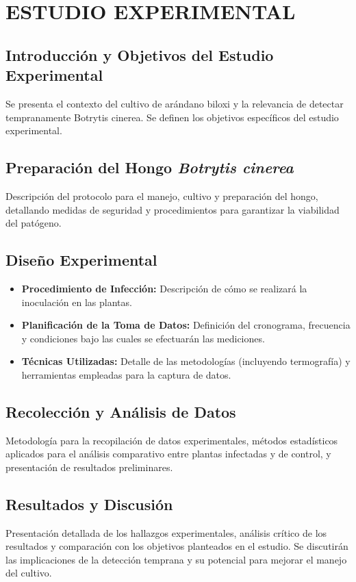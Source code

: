 \chapter{ESTUDIO EXPERIMENTAL}

\section{Introducción y Objetivos del Estudio Experimental}
Se presenta el contexto del cultivo de arándano biloxi y la relevancia de detectar tempranamente Botrytis cinerea. Se definen los objetivos específicos del estudio experimental.

\section{Preparación del Hongo \textit{Botrytis cinerea}}
Descripción del protocolo para el manejo, cultivo y preparación del hongo, detallando medidas de seguridad y procedimientos para garantizar la viabilidad del patógeno.

\section{Diseño Experimental}
\begin{itemize}
    \item \textbf{Procedimiento de Infección:} Descripción de cómo se realizará la inoculación en las plantas.
    \item \textbf{Planificación de la Toma de Datos:} Definición del cronograma, frecuencia y condiciones bajo las cuales se efectuarán las mediciones.
    \item \textbf{Técnicas Utilizadas:} Detalle de las metodologías (incluyendo termografía) y herramientas empleadas para la captura de datos.
\end{itemize}

\section{Recolección y Análisis de Datos}
Metodología para la recopilación de datos experimentales, métodos estadísticos aplicados para el análisis comparativo entre plantas infectadas y de control, y presentación de resultados preliminares.

\section{Resultados y Discusión}
Presentación detallada de los hallazgos experimentales, análisis crítico de los resultados y comparación con los objetivos planteados en el estudio. Se discutirán las implicaciones de la detección temprana y su potencial para mejorar el manejo del cultivo.